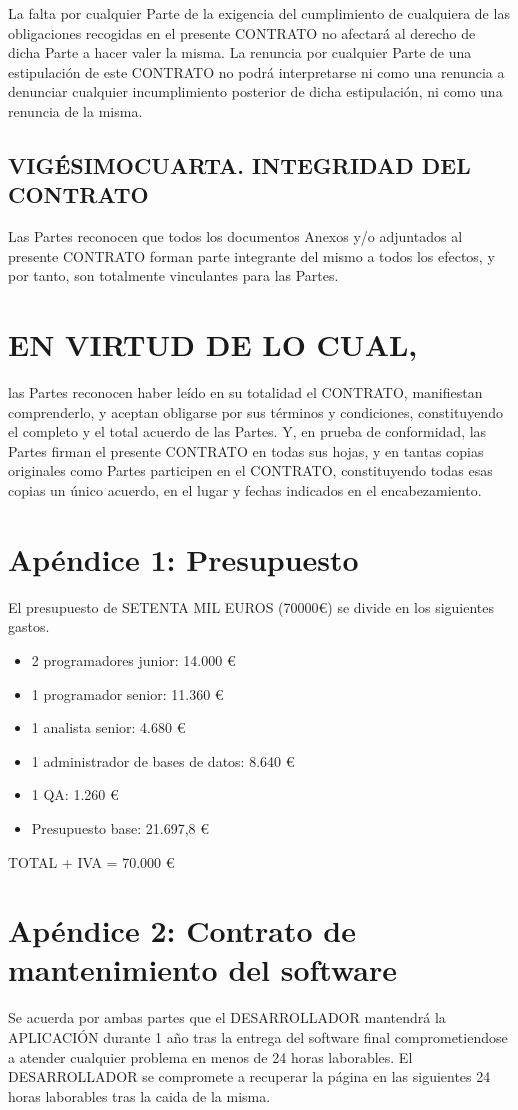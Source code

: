 \documentclass[a4paper,11pt]{report}
\begin{document}
	La falta por cualquier Parte de la exigencia del cumplimiento de
	cualquiera de las obligaciones recogidas en el presente CONTRATO no
	afectará al derecho de dicha Parte a hacer valer la misma. La renuncia
	por cualquier Parte de una estipulación de este CONTRATO no podrá
	interpretarse ni como una renuncia a denunciar cualquier incumplimiento
	posterior de dicha estipulación, ni como una renuncia de la misma.

	\subsection*{VIGÉSIMOCUARTA. INTEGRIDAD DEL CONTRATO}

	Las Partes reconocen que todos los documentos Anexos y/o adjuntados al
	presente CONTRATO forman parte integrante del mismo a todos los efectos,
	y por tanto, son totalmente vinculantes para las Partes.

	\section*{EN VIRTUD DE LO CUAL,}
	las Partes reconocen haber leído en su totalidad el CONTRATO, manifiestan
	comprenderlo, y aceptan obligarse por sus términos y condiciones,
	constituyendo el completo y el total acuerdo de las Partes. Y, en prueba de
	conformidad, las Partes firman el presente CONTRATO en todas sus hojas, y en
	tantas copias originales como Partes participen en el CONTRATO, constituyendo
	todas esas copias un único acuerdo, en el lugar y fechas indicados en el
	encabezamiento.

	\newpage
	\section*{Apéndice 1: Presupuesto}\label{apen_presu}
    El presupuesto de SETENTA MIL EUROS (70000\euro) se divide en los siguientes gastos.
    \begin{itemize}
        \item 2 programadores junior: 14.000 \euro
        \item 1 programador senior: 11.360 \euro
        \item 1 analista senior: 4.680 \euro
        \item 1 administrador de bases de datos: 8.640 \euro
        \item 1 QA: 1.260 \euro
        \item Presupuesto base: 21.697,8 \euro
    \end{itemize}
    TOTAL + IVA = 70.000 \euro
	\section*{Apéndice 2: Contrato de mantenimiento del software}
	Se acuerda por ambas partes que el DESARROLLADOR mantendrá la APLICACIÓN
	durante 1 año tras la entrega del software final comprometiendose a atender
	cualquier problema en menos de 24 horas laborables. El DESARROLLADOR se
	compromete a recuperar la página en las siguientes 24 horas laborables tras
	la caida de la misma.
\end{document}
